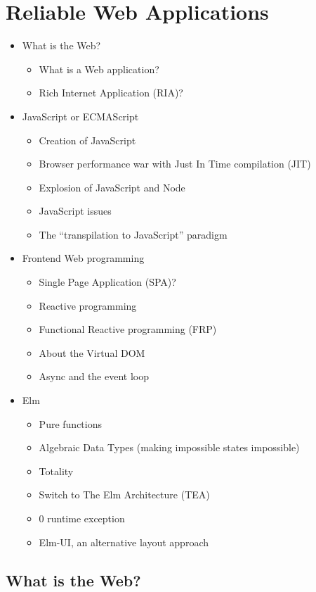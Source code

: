\chapter{Reliable Web Applications}%
\label{cha:reliable_web_applications}

\begin{itemize}
	\item What is the Web?
	\begin{itemize}
		\item What is a Web application?
		\item Rich Internet Application (RIA)?
	\end{itemize}
	\item JavaScript or ECMAScript
	\begin{itemize}
		\item Creation of JavaScript
		\item Browser performance war with Just In Time compilation (JIT)
		\item Explosion of JavaScript and Node
		\item JavaScript issues
		\item The ``transpilation to JavaScript'' paradigm
	\end{itemize}
	\item Frontend Web programming
	\begin{itemize}
		\item Single Page Application (SPA)?
		\item Reactive programming
		\item Functional Reactive programming (FRP)
		\item About the Virtual DOM
		\item Async and the event loop
	\end{itemize}
	\item Elm
	\begin{itemize}
		\item Pure functions
		\item Algebraic Data Types (making impossible states impossible)
		\item Totality
		\item Switch to The Elm Architecture (TEA)
		\item 0 runtime exception
		\item Elm-UI, an alternative layout approach
	\end{itemize}
\end{itemize}


\section{What is the Web?}%
\label{sec:web}

